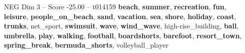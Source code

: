\begin{textsample}{NEG Dim 3 – Score -25.00 – t014159}  \label{ex:f3_neg_013}
\textbf{beach}, \textbf{summer}, \textbf{recreation}, \textbf{fun}, \textbf{leisure}, \textbf{people\_on\_beach}, \textbf{sand}, \textbf{vacation}, \textbf{sea}, \textbf{shore}, \textbf{holiday}, \textbf{coast}, \textbf{trunks}, net\_sport, \textbf{swimsuit}, \textbf{wave}, \textbf{wind\_wave}, high-rise\_building, \textbf{ball}, \textbf{umbrella}, \textbf{play}, \textbf{walking}, \textbf{football}, \textbf{boardshorts}, \textbf{barefoot}, \textbf{resort\_town}, \textbf{spring\_break}, \textbf{bermuda\_shorts}, volleyball\_player

\end{textsample}
